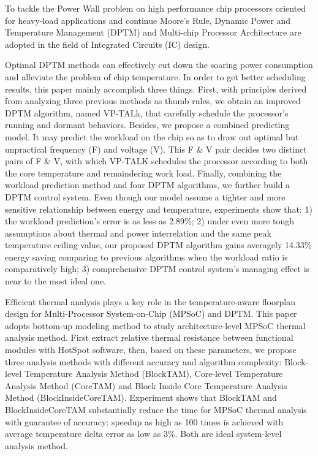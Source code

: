 
\begin{eabstract}


To tackle the Power Wall problem on high performance chip processors oriented for heavy-load applications and continue Moore's Rule, Dynamic Power and Temperature Management (DPTM) and Multi-chip Processor Architecture are adopted in the field of Integrated Circuits (IC) design.

Optimal DPTM methods can effectively cut down the soaring power consumption and alleviate the problem of chip temperature. In order to get better scheduling results, this paper mainly accomplish three things. First, with principles derived from analyzing three previous methods as thumb rules, we obtain an improved DPTM algorithm, named VP-TALk, that carefully schedule the processor's running and dormant behaviors. Besides, we propose a combined predicting model. It may predict the workload on the chip so as to draw out optimal but unpractical frequency (F) and voltage (V). This F \& V pair decides two distinct pairs of F \& V, with which VP-TALK schedules the processor according to both the core temperature and remaindering work load. Finally, combining the workload prediction method and four DPTM algorithms, we further build a DPTM control system. Even though our model assume a tighter and more sensitive relationship between energy and temperature, experiments show that: 1) the workload prediction's error is as less as 2.89\%; 2) under even more tough assumptions about thermal and power interrelation and the same peak temperature ceiling value, our proposed DPTM algorithm gains averagely 14.33\% energy saving comparing to previous algorithms when the workload ratio is comparatively high; 3) comprehensive DPTM control system's managing effect is near to the most ideal one.


Efficient thermal analysis plays a key role in the temperature-aware floorplan design for Multi-Processor System-on-Chip (MPSoC) and DPTM. This paper adopts bottom-up modeling method to study architecture-level MPSoC thermal analysis method. First extract relative thermal resistance between functional modules with HotSpot software, then, based on these parameters, we propose three analysis methods with different accuracy and algorithm complexity: Block-level Temperature Analysis Method (BlockTAM), Core-level Temperature Analysis Method (CoreTAM) and Block Inside Core Temperature Analysis Method (BlockInsideCoreTAM). Experiment shows that BlockTAM and BlockInsideCoreTAM substantially reduce the time for MPSoC thermal analysis with guarantee of accuracy: speedup as high as 100 times is achieved with average temperature delta error as low as 3\%. Both are ideal system-level analysis method.

\end{eabstract}


